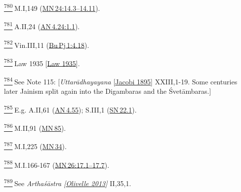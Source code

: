 \label{footprints_split_025.html_fn780}
\hyperref[footprints_split_019.htmlux5cux23fnref780]{\textsuperscript{780}} M.I,149
(\href{https://suttacentral.net/mn24/en/sujato\#14.3}{MN\,24:14.3--14.11}).

\label{footprints_split_025.html_fn781}
\hyperref[footprints_split_019.htmlux5cux23fnref781]{\textsuperscript{781}} A.II,24
(\href{https://suttacentral.net/an4.24/en/sujato\#1.1}{AN\,4.24:1.1}).

\label{footprints_split_025.html_fn782}
\hyperref[footprints_split_019.htmlux5cux23fnref782]{\textsuperscript{782}} Vin.III,11
(\href{https://suttacentral.net/pli-tv-bu-vb-pj1/en/brahmali\#4.18}{Bu\,Pj\,1:4.18}).

\label{footprints_split_025.html_fn783}
\hyperref[footprints_split_019.htmlux5cux23fnref783]{\textsuperscript{783}} {Law
1935
{{[}\hyperref[footprints_split_022.htmlux5cux23Lawux5cux25201935]{Law
1935}{]}}}.

\label{footprints_split_025.html_fn784}
\hyperref[footprints_split_019.htmlux5cux23fnref784]{\textsuperscript{784}} See
Note 115: {[}{\emph{Uttarādhayayana}
{{[}\hyperref[footprints_split_022.htmlux5cux23Jacobiux5cux25201895]{Jacobi
1895}{]}}} XXIII,1-19. Some centuries later Jainism split again into the
Digambaras and the Śvetāmbaras.{]}

\label{footprints_split_025.html_fn785}
\hyperref[footprints_split_019.htmlux5cux23fnref785]{\textsuperscript{785}} E.g.
A.II,61 (\href{https://suttacentral.net/an4.55/en/sujato}{AN\,4.55});
S.III,1 (\href{https://suttacentral.net/sn22.1/en/sujato}{SN\,22.1}).

\label{footprints_split_025.html_fn786}
\hyperref[footprints_split_019.htmlux5cux23fnref786]{\textsuperscript{786}} M.II,91
(\href{https://suttacentral.net/mn85/en/sujato}{MN\,85}).

\label{footprints_split_025.html_fn787}
\hyperref[footprints_split_019.htmlux5cux23fnref787]{\textsuperscript{787}} M.I,225
(\href{https://suttacentral.net/mn34/en/sujato}{MN\,34}).

\label{footprints_split_025.html_fn788}
\hyperref[footprints_split_019.htmlux5cux23fnref788]{\textsuperscript{788}} M.I.166-167
(\href{https://suttacentral.net/mn26/en/sujato\#17.1}{MN\,26:17.1--17.7}).

\label{footprints_split_025.html_fn789}
\hyperref[footprints_split_019.htmlux5cux23fnref789]{\textsuperscript{789}} See
\emph{{Arthaśāstra
{{[}\hyperref[footprints_split_022.htmlux5cux23Olivelleux5cux25202013]{Olivelle
2013}{]}}}} II,35,1.

